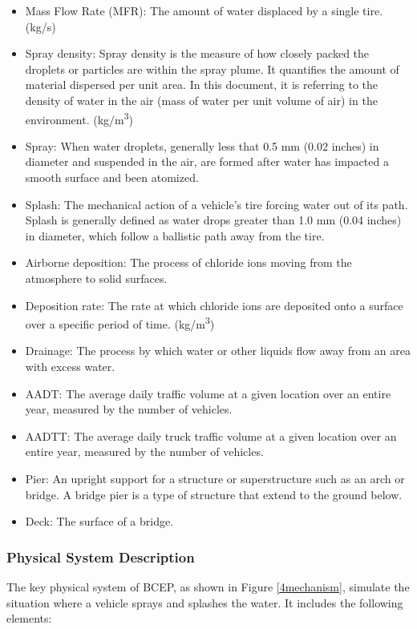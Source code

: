 \documentclass[12pt]{article}
\begin{document}
\begin{itemize}
\item Mass Flow Rate (MFR): The amount of water displaced by a single tire. (kg/s)
\item Spray density: Spray density is the measure of how closely packed the droplets or particles are within the spray plume. It quantifies the amount of material dispersed per unit area. In this document, it is referring to the density of water in the air (mass of water per unit volume of air) in the environment. (\si{kg/m^3})
\item Spray: When water droplets, generally less that 0.5 mm (0.02 inches) in diameter and suspended in the air, are formed after water has impacted a smooth surface and been atomized.
\item Splash: The mechanical action of a vehicle’s tire forcing water out of its path. Splash is generally defined as water drops greater than 1.0 mm (0.04 inches) in diameter, which follow a ballistic path away from the tire.
\item Airborne deposition: The process of chloride ions moving from the atmosphere to solid surfaces.
\item Deposition rate: The rate at which chloride ions are deposited onto a surface over a specific period of time. (\si{kg/m^3})
\item Drainage: The process by which water or other liquids flow away from an area with excess water.
\item AADT: The average daily traffic volume at a given location over an entire year, measured by the number of vehicles.
\item AADTT: The average daily truck traffic volume at a given location over an entire year, measured by the number of vehicles.
\item Pier: An upright support for a structure or superstructure such as an arch or bridge. A bridge pier is a type of structure that extend to the ground below.
\item Deck: The surface of a bridge.

\end{itemize}

\subsubsection{Physical System Description} \label{sec_phySystDescrip}


The key physical system of BCEP, as shown in Figure \ref{4mechanism}, simulate the situation where a vehicle sprays and splashes the water. It includes the following elements:
\end{document}
